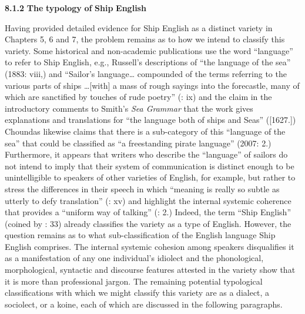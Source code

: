   \textbf{8.1.2} \textbf{The} \textbf{typology} \textbf{of} \textbf{Ship} \textbf{English} 

Having provided detailed evidence for Ship English as a distinct variety in Chapters 5, 6 and 7, the problem remains as to how we intend to classify this variety. Some historical and non-academic publications use the word “language” to refer to Ship English, e.g., Russell’s descriptions of “the language of the sea” (1883: viii,) and “Sailor’s language… compounded of the terms referring to the various parts of ships …[with] a mass of rough sayings into the forecastle, many of which are sanctified by touches of rude poetry” (\citealt{Russell1883}: ix) and the claim in the introductory comments to Smith’s \textit{Sea Grammar} that the work gives explanations and translations for “the language both of ships and Seas” (\citealt{Smith1968}[1627.]) Choundas likewise claims that there is a sub-category of this “language of the sea” that could be classified as “a freestanding pirate language” (2007: 2.) Furthermore, it appears that writers who describe the “language” of sailors do not intend to imply that their system of communication is distinct enough to be unintelligible to speakers of other varieties of English, for example, but rather to stress the differences in their speech in which “meaning is really so subtle as utterly to defy translation” (\citealt{Russell1883}: xv) and highlight the internal systemic coherence that provides a “uniform way of talking” (\citealt{Choundas2007}: 2.) Indeed, the term “Ship English” (coined by \citealt{Hancock1976}: 33) already classifies the variety as a type of English. However, the question remains as to what sub-classification of the English language Ship English comprises. The internal systemic cohesion among speakers disqualifies it as a manifestation of any one individual’s idiolect and the phonological, morphological, syntactic and discourse features attested in the variety show that it is more than professional jargon. The remaining potential typological classifications with which we might classify this variety are as a dialect, a sociolect, or a koine, each of which are discussed in the following paragraphs. 

